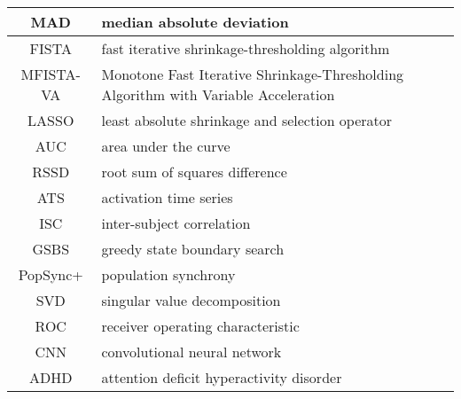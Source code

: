 \begin{table}[h]
\begin{tabular}{|c|p{}|}
    \hline
    MAD & median absolute deviation \\
    \hline
    FISTA & fast iterative shrinkage-thresholding algorithm \\
    \hline
    MFISTA-VA & Monotone Fast Iterative Shrinkage-Thresholding Algorithm with Variable Acceleration \\
    \hline
    LASSO & least absolute shrinkage and selection operator \\
    \hline
    AUC & area under the curve \\
    \hline
    RSSD & root sum of squares difference \\
    \hline
    ATS & activation time series \\
    \hline
    ISC & inter-subject correlation \\
    \hline
    GSBS & greedy state boundary search \\
    \hline
    PopSync+ & population synchrony \\
    \hline
    SVD & singular value decomposition \\
    \hline
    ROC & receiver operating characteristic \\
    \hline
    CNN & convolutional neural network \\
    \hline
    ADHD & attention deficit hyperactivity disorder \\
    \hline
    \end{tabular}
\end{table}
